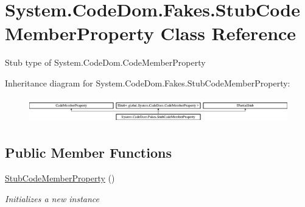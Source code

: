 \hypertarget{class_system_1_1_code_dom_1_1_fakes_1_1_stub_code_member_property}{\section{System.\-Code\-Dom.\-Fakes.\-Stub\-Code\-Member\-Property Class Reference}
\label{class_system_1_1_code_dom_1_1_fakes_1_1_stub_code_member_property}
}


Stub type of System.\-Code\-Dom.\-Code\-Member\-Property 


Inheritance diagram for System.\-Code\-Dom.\-Fakes.\-Stub\-Code\-Member\-Property\-:\begin{figure}[H]
\begin{center}
\leavevmode
\includegraphics[height=1.104536cm]{class_system_1_1_code_dom_1_1_fakes_1_1_stub_code_member_property}
\end{center}
\end{figure}
\subsection*{Public Member Functions}
\begin{DoxyCompactItemize}
\item 
\hyperlink{class_system_1_1_code_dom_1_1_fakes_1_1_stub_code_member_property_ab6f54563d60a14405c44b99bcfe25830}{Stub\-Code\-Member\-Property} ()
\begin{DoxyCompactList}\small\item\em Initializes a new instance\end{DoxyCompactList}\end{DoxyCompactItemize}

